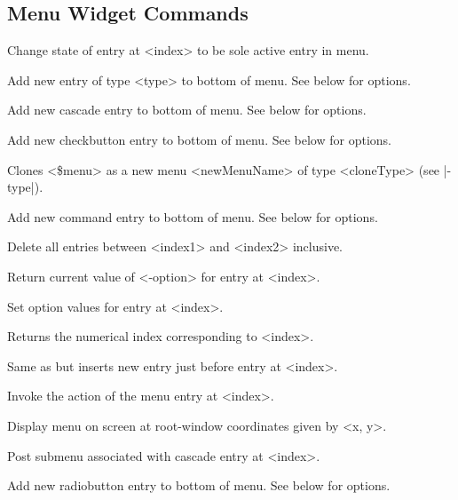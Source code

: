 \subsection*{Menu Widget Commands}
\begin{enum}{1cm}

Change state of entry at <index> to be sole active entry in menu.

Add new entry of type <type> to bottom of menu. See below for options.

Add new cascade entry to bottom of menu. See below for options.

Add new checkbutton entry to bottom of menu. See below for options.

Clones <\$menu> as a new menu <newMenuName> of type <cloneType> (see |-type|).

Add new command entry to bottom of menu. See below for options.

Delete all entries between <index1> and <index2> inclusive.

Return current value of <-option> for entry at <index>.

Set option values for entry at <index>.

Returns the numerical index corresponding to <index>.

Same as  but inserts new entry just before entry at <index>.

Invoke the action of the menu entry at <index>.

Display menu on screen at  root-window  coordinates  given by <x, y>.

Post submenu associated with cascade entry at <index>.

Add new radiobutton entry to bottom of menu. See below for options.


\end{enum}
